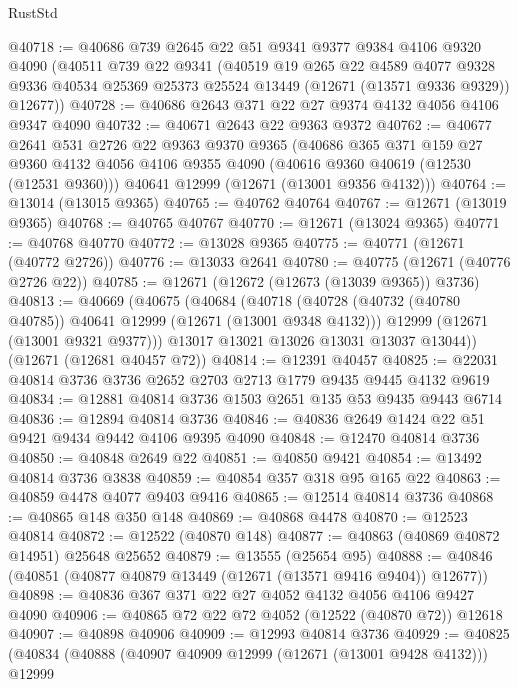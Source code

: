 \begin{lexlean}{RustStd}
\begin{coremodule}
@40718 := @40686
    @739
    @2645
    @22
    @51
    @9341
    @9377
    @9384
    @4106
    @9320
    @4090
    (@40511
      @739
      @22
      @9341
      (@40519
        @19
        @265
        @22
        @4589
        @4077
        @9328
        @9336
        @40534
        @25369
        @25373
        @25524
        @13449
        (@12671 (@13571 @9336 @9329))
        @12677))
@40728 := @40686 @2643 @371 @22 @27 @9374 @4132 @4056 @4106 @9347 @4090
@40732 := @40671 @2643 @22 @9363 @9372
@40762 := @40677
    @2641
    @531
    @2726
    @22
    @9363
    @9370
    @9365
    (@40686
      @365
      @371
      @159
      @27
      @9360
      @4132
      @4056
      @4106
      @9355
      @4090
      (@40616 @9360 @40619 (@12530 (@12531 @9360)))
      @40641
      @12999
      (@12671 (@13001 @9356 @4132)))
@40764 := @13014 (@13015 @9365)
@40765 := @40762 @40764
@40767 := @12671 (@13019 @9365)
@40768 := @40765 @40767
@40770 := @12671 (@13024 @9365)
@40771 := @40768 @40770
@40772 := @13028 @9365
@40775 := @40771 (@12671 (@40772 @2726))
@40776 := @13033 @2641
@40780 := @40775 (@12671 (@40776 @2726 @22))
@40785 := @12671 (@12672 (@12673 (@13039 @9365)) @3736)
@40813 := @40669
    (@40675
      (@40684
        (@40718
          (@40728 (@40732 (@40780 @40785)) @40641 @12999 (@12671 (@13001 @9348 @4132)))
          @12999
          (@12671 (@13001 @9321 @9377)))
        @13017
        @13021
        @13026
        @13031
        @13037
        @13044))
    (@12671 (@12681 @40457 @72))
@40814 := @12391 @40457
@40825 := @22031 @40814 @3736 @3736 @2652 @2703 @2713 @1779 @9435 @9445 @4132 @9619
@40834 := @12881 @40814 @3736 @1503 @2651 @135 @53 @9435 @9443 @6714
@40836 := @12894 @40814 @3736
@40846 := @40836 @2649 @1424 @22 @51 @9421 @9434 @9442 @4106 @9395 @4090
@40848 := @12470 @40814 @3736
@40850 := @40848 @2649 @22
@40851 := @40850 @9421
@40854 := @13492 @40814 @3736 @3838
@40859 := @40854 @357 @318 @95 @165 @22
@40863 := @40859 @4478 @4077 @9403 @9416
@40865 := @12514 @40814 @3736
@40868 := @40865 @148 @350 @148
@40869 := @40868 @4478
@40870 := @12523 @40814
@40872 := @12522 (@40870 @148)
@40877 := @40863 (@40869 @40872 @14951) @25648 @25652
@40879 := @13555 (@25654 @95)
@40888 := @40846 (@40851 (@40877 @40879 @13449 (@12671 (@13571 @9416 @9404)) @12677))
@40898 := @40836 @367 @371 @22 @27 @4052 @4132 @4056 @4106 @9427 @4090
@40906 := @40865 @72 @22 @72 @4052 (@12522 (@40870 @72)) @12618
@40907 := @40898 @40906
@40909 := @12993 @40814 @3736
@40929 := @40825
    (@40834
      (@40888
        (@40907 @40909 @12999 (@12671 (@13001 @9428 @4132)))
        @12999

\end{coremodule}
\end{lexlean}
